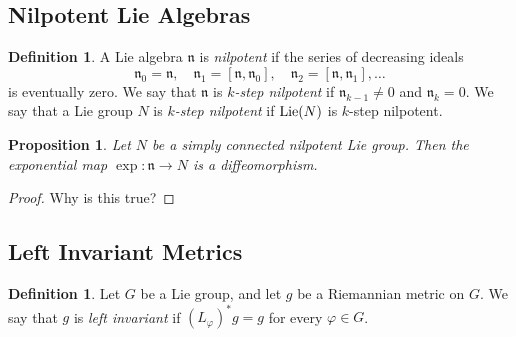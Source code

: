 \documentclass{amsart}[]
\newcommand{\alert}[1]{\color{red}#1\color{black}}
\newcommand{\lie}{\text{\normalfont Lie}}
\theoremstyle{plain}
\newtheorem{proposition}[theorem]{Proposition}
\theoremstyle{definition}
\newtheorem{definition}[theorem]{Definition}
\theoremstyle{remark}
\begin{document}
	\subsection{Nilpotent Lie Algebras}
	\begin{definition}
		A Lie algebra $\mathfrak n$ is \emph{nilpotent} if the series of decreasing ideals 
		$$\mathfrak n_0 = \mathfrak n, \quad \mathfrak n_1 = [\mathfrak n, \mathfrak n_0], \quad \mathfrak n_2 = [\mathfrak n, \mathfrak n_1],\ldots$$
		is eventually zero. 
		We say that $\mathfrak n$ is \emph{$k$-step nilpotent} if $\mathfrak n_{k-1} \neq 0$ and $\mathfrak n_k = 0$.
		We say that a Lie group $N$ is \emph{$k$-step nilpotent} if $\lie(N)$ is $k$-step nilpotent.
	\end{definition}
	\begin{proposition}
		Let $N$ be a simply connected nilpotent Lie group. Then the exponential map $\exp: \mathfrak n \rightarrow N$ is a diffeomorphism.
	\end{proposition}
	\begin{proof}
		\alert{Why is this true?}
	\end{proof}
	
	\subsection{Left Invariant Metrics}
	\begin{definition}
		Let $G$ be a Lie group, and let $g$ be a Riemannian metric on $G$. We say that $g$ is \emph{left invariant} if $(L_\varphi)^* g = g$ for every $\varphi \in G$.
	\end{definition}
	
\end{document}
